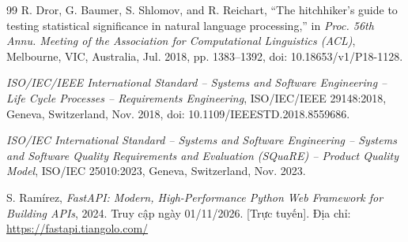 \begin{thebibliography}{99}
R. Dror, G. Baumer, S. Shlomov, and R. Reichart, ``The hitchhiker's guide to testing statistical significance in natural language processing,'' in \textit{Proc. 56th Annu. Meeting of the Association for Computational Linguistics (ACL)}, Melbourne, VIC, Australia, Jul. 2018, pp. 1383--1392, doi: 10.18653/v1/P18-1128.

\textit{ISO/IEC/IEEE International Standard -- Systems and Software Engineering -- Life Cycle Processes -- Requirements Engineering}, ISO/IEC/IEEE 29148:2018, Geneva, Switzerland, Nov. 2018, doi: 10.1109/IEEESTD.2018.8559686.

\textit{ISO/IEC International Standard -- Systems and Software Engineering -- Systems and Software Quality Requirements and Evaluation (SQuaRE) -- Product Quality Model}, ISO/IEC 25010:2023, Geneva, Switzerland, Nov. 2023.

S. Ram\'irez, \textit{FastAPI: Modern, High-Performance Python Web Framework for Building APIs}, 2024. Truy cập ngày 01/11/2026. [Trực tuyến]. Địa chỉ: \url{https://fastapi.tiangolo.com/}

\end{thebibliography}
